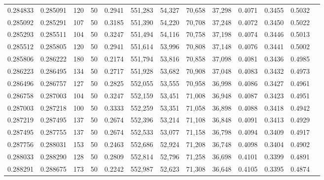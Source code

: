 \begin{tabular}{rrrrrrrrrrrrr}
0.284833 & 0.285091 &   120 &  50 &                                     0.2941 & 551,283 &  54,327 &  70,658 &  37,298 & 0.4071 & 0.3455 & 0.5032 \\
0.285092 & 0.285291 &   107 &  50 &                                     0.3185 & 551,390 &  54,220 &  70,708 &  37,248 & 0.4072 & 0.3450 & 0.5022 \\
0.285293 & 0.285511 &   104 &  50 &                                     0.3247 & 551,494 &  54,116 &  70,758 &  37,198 & 0.4074 & 0.3446 & 0.5013 \\
0.285512 & 0.285805 &   120 &  50 &                                     0.2941 & 551,614 &  53,996 &  70,808 &  37,148 & 0.4076 & 0.3441 & 0.5002 \\
0.285806 & 0.286222 &   180 &  50 &                                     0.2174 & 551,794 &  53,816 &  70,858 &  37,098 & 0.4081 & 0.3436 & 0.4985 \\
0.286223 & 0.286495 &   134 &  50 &                                     0.2717 & 551,928 &  53,682 &  70,908 &  37,048 & 0.4083 & 0.3432 & 0.4973 \\
0.286496 & 0.286757 &   127 &  50 &                                     0.2825 & 552,055 &  53,555 &  70,958 &  36,998 & 0.4086 & 0.3427 & 0.4961 \\
0.286758 & 0.287003 &   104 &  50 &                                     0.3247 & 552,159 &  53,451 &  71,008 &  36,948 & 0.4087 & 0.3423 & 0.4951 \\
0.287003 & 0.287218 &   100 &  50 &                                     0.3333 & 552,259 &  53,351 &  71,058 &  36,898 & 0.4088 & 0.3418 & 0.4942 \\
0.287219 & 0.287495 &   137 &  50 &                                     0.2674 & 552,396 &  53,214 &  71,108 &  36,848 & 0.4091 & 0.3413 & 0.4929 \\
0.287495 & 0.287755 &   137 &  50 &                                     0.2674 & 552,533 &  53,077 &  71,158 &  36,798 & 0.4094 & 0.3409 & 0.4917 \\
0.287756 & 0.288031 &   153 &  50 &                                     0.2463 & 552,686 &  52,924 &  71,208 &  36,748 & 0.4098 & 0.3404 & 0.4902 \\
0.288033 & 0.288290 &   128 &  50 &                                     0.2809 & 552,814 &  52,796 &  71,258 &  36,698 & 0.4101 & 0.3399 & 0.4891 \\
0.288291 & 0.288675 &   173 &  50 &                                     0.2242 & 552,987 &  52,623 &  71,308 &  36,648 & 0.4105 & 0.3395 & 0.4874 \\

\end{tabular}
